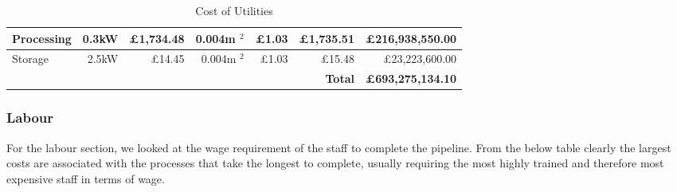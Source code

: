\documentclass[a4paper, 11pt]{article}
\numberwithin{equation}{section}
\begin{document}
\begin{table}[H]
{\begin{tabular}{|l|l|l|l|l|l|l|}
Processing	&	\multicolumn{1}{r|}{	0.3kW	}	&	\multicolumn{1}{r|}{	\pounds	1,734.48	}	&	\multicolumn{1}{r|}{	0.004m	$	^2	$	}				&	\multicolumn{1}{r|}{	\pounds	1.03	}	&	\multicolumn{1}{r|}{	\pounds	1,735.51	}	&	\multicolumn{1}{r|}{	\pounds	216,938,550.00	}	\\	\hline
Storage 	&	\multicolumn{1}{r|}{	2.5kW	}	&	\multicolumn{1}{r|}{	\pounds	14.45	}	&	\multicolumn{1}{r|}{	0.004m	$	^2	$	}				&	\multicolumn{1}{r|}{	\pounds	1.03	}	&	\multicolumn{1}{r|}{	\pounds	15.48	}	&	\multicolumn{1}{r|}{	\pounds	23,223,600.00	}	\\	\hline

 	&		&	\multicolumn{1}{r|}{		}	&	\multicolumn{1}{r|}{				}				&	\multicolumn{1}{r|}{			}	&	\multicolumn{1}{r|}{		\textbf{Total}	}	&	\multicolumn{1}{r|}{	\textbf{\pounds 693,275,134.10}		}	\\	\hline

\end{tabular}
}
\captionsetup{justification=centering}
\caption{Cost of Utilities}
\label{table:Utilitiescost}
\end{table}




\subsubsection{Labour}

For the labour section, we looked at the wage requirement of the staff to complete the pipeline. From the below table clearly the largest costs are associated with the processes that take the longest to complete, usually requiring the most highly trained and therefore most expensive staff in terms of wage. 
\end{document}
